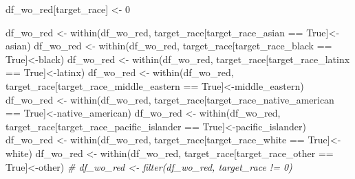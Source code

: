 \documentclass[
]{article}
\newenvironment{Shaded}{\begin{snugshade}}{\end{snugshade}}
\newcommand{\CommentTok}[1]{\textcolor[rgb]{0.56,0.35,0.01}{\textit{#1}}}
\newcommand{\DecValTok}[1]{\textcolor[rgb]{0.00,0.00,0.81}{#1}}
\newcommand{\FunctionTok}[1]{\textcolor[rgb]{0.00,0.00,0.00}{#1}}
\newcommand{\NormalTok}[1]{#1}
\newcommand{\OtherTok}[1]{\textcolor[rgb]{0.56,0.35,0.01}{#1}}
\newcommand{\SpecialCharTok}[1]{\textcolor[rgb]{0.00,0.00,0.00}{#1}}
\newcommand{\StringTok}[1]{\textcolor[rgb]{0.31,0.60,0.02}{#1}}
\begin{document}
\begin{Shaded}
\begin{Highlighting}[]
\NormalTok{df\_wo\_red[}\StringTok{\textquotesingle{}target\_race\textquotesingle{}}\NormalTok{] }\OtherTok{\textless{}{-}} \DecValTok{0}

\NormalTok{df\_wo\_red }\OtherTok{\textless{}{-}} \FunctionTok{within}\NormalTok{(df\_wo\_red, target\_race[target\_race\_asian }\SpecialCharTok{==} \StringTok{\textquotesingle{}True\textquotesingle{}}\NormalTok{]}\OtherTok{\textless{}{-}}\StringTok{\textquotesingle{}asian\textquotesingle{}}\NormalTok{)}
\NormalTok{df\_wo\_red }\OtherTok{\textless{}{-}} \FunctionTok{within}\NormalTok{(df\_wo\_red, target\_race[target\_race\_black }\SpecialCharTok{==} \StringTok{\textquotesingle{}True\textquotesingle{}}\NormalTok{]}\OtherTok{\textless{}{-}}\StringTok{\textquotesingle{}black\textquotesingle{}}\NormalTok{)}
\NormalTok{df\_wo\_red }\OtherTok{\textless{}{-}} \FunctionTok{within}\NormalTok{(df\_wo\_red, target\_race[target\_race\_latinx }\SpecialCharTok{==} \StringTok{\textquotesingle{}True\textquotesingle{}}\NormalTok{]}\OtherTok{\textless{}{-}}\StringTok{\textquotesingle{}latinx\textquotesingle{}}\NormalTok{)}
\NormalTok{df\_wo\_red }\OtherTok{\textless{}{-}} \FunctionTok{within}\NormalTok{(df\_wo\_red, target\_race[target\_race\_middle\_eastern }\SpecialCharTok{==} \StringTok{\textquotesingle{}True\textquotesingle{}}\NormalTok{]}\OtherTok{\textless{}{-}}\StringTok{\textquotesingle{}middle\_eastern\textquotesingle{}}\NormalTok{)}
\NormalTok{df\_wo\_red }\OtherTok{\textless{}{-}} \FunctionTok{within}\NormalTok{(df\_wo\_red, target\_race[target\_race\_native\_american }\SpecialCharTok{==} \StringTok{\textquotesingle{}True\textquotesingle{}}\NormalTok{]}\OtherTok{\textless{}{-}}\StringTok{\textquotesingle{}native\_american\textquotesingle{}}\NormalTok{)}
\NormalTok{df\_wo\_red }\OtherTok{\textless{}{-}} \FunctionTok{within}\NormalTok{(df\_wo\_red, target\_race[target\_race\_pacific\_islander }\SpecialCharTok{==} \StringTok{\textquotesingle{}True\textquotesingle{}}\NormalTok{]}\OtherTok{\textless{}{-}}\StringTok{\textquotesingle{}pacific\_islander\textquotesingle{}}\NormalTok{)}
\NormalTok{df\_wo\_red }\OtherTok{\textless{}{-}} \FunctionTok{within}\NormalTok{(df\_wo\_red, target\_race[target\_race\_white }\SpecialCharTok{==} \StringTok{\textquotesingle{}True\textquotesingle{}}\NormalTok{]}\OtherTok{\textless{}{-}}\StringTok{\textquotesingle{}white\textquotesingle{}}\NormalTok{)}
\NormalTok{df\_wo\_red }\OtherTok{\textless{}{-}} \FunctionTok{within}\NormalTok{(df\_wo\_red, target\_race[target\_race\_other }\SpecialCharTok{==} \StringTok{\textquotesingle{}True\textquotesingle{}}\NormalTok{]}\OtherTok{\textless{}{-}}\StringTok{\textquotesingle{}other\textquotesingle{}}\NormalTok{)}
\CommentTok{\# df\_wo\_red \textless{}{-} filter(df\_wo\_red, target\_race != 0)}


\end{Highlighting}
\end{Shaded}
\end{document}
